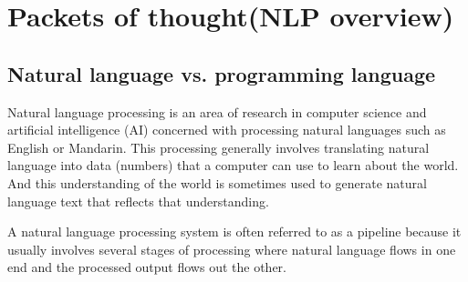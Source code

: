 \chapter{Packets of thought(NLP overview)\label{Ch01}}
\section{Natural language vs. programming language}
\begin{definition}
    Natural language processing is an area of research in computer science and artificial intelligence (AI) concerned with processing natural languages such as English or Mandarin. This processing generally involves
    translating natural language into data (numbers) that a computer can use to
    learn about the world. And this understanding of the world is sometimes used
    to generate natural language text that reflects that understanding.
\end{definition}

\begin{definition}
    A natural language processing system is often referred to as a
    pipeline because it usually involves several stages of processing where natural
    language flows in one end and the processed output flows out the other.
\end{definition}